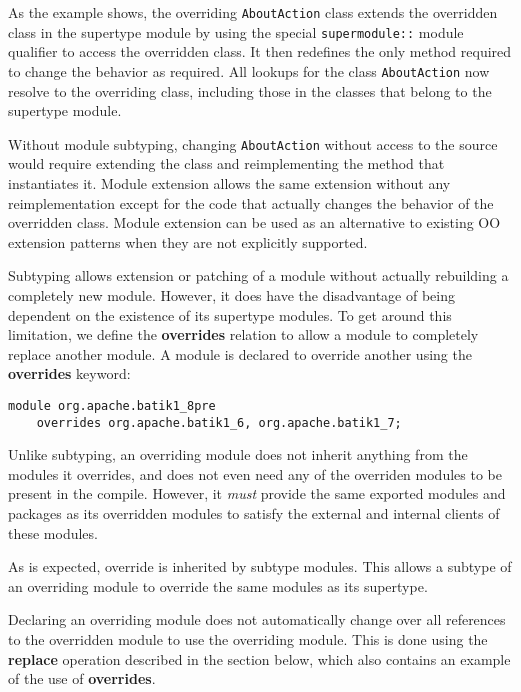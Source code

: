 As the example shows, the overriding \texttt{AboutAction} class extends the
overridden class in the supertype module by using the special 
\texttt{supermodule::} module qualifier to access the overridden class. It
then redefines the only method required to change the behavior as required.
All lookups for the class \texttt{AboutAction} now resolve to the overriding
class, including those in the classes that belong to the supertype module.

Without module subtyping, changing \texttt{AboutAction} without access to the source
would require extending the class and reimplementing the method 
that instantiates it. Module extension allows the same extension without
any reimplementation except for the code that actually changes the behavior of the overridden class.
Module extension can be used as an alternative to existing OO extension patterns when they
are not explicitly supported.


Subtyping allows extension or patching of a module without actually
rebuilding a completely new module. However, it does have the disadvantage
of being dependent on the existence of its supertype modules. To get
around this limitation, we define the \textbf{overrides} relation to allow
a module to completely replace another module. A module is declared
to override another using the \textbf{overrides} keyword:

\begin{lstlisting}
module org.apache.batik1_8pre 
	overrides org.apache.batik1_6, org.apache.batik1_7;
\end{lstlisting}

Unlike subtyping, an overriding module does not inherit anything from the
modules it overrides, and does not even need any of the overriden modules to
be present in the compile. However, it \textit{must} provide the same exported modules
and packages as its overridden modules to satisfy the external and internal
clients of these modules. 

As is expected, override is inherited by subtype modules. This allows a subtype
of an overriding module to override the same modules as its supertype.

Declaring an overriding module does not automatically change over all references
to the overridden module to use the overriding module. This is done using the
\textbf{replace} operation described in the section below, which also contains
an example of the use of \textbf{overrides}.

